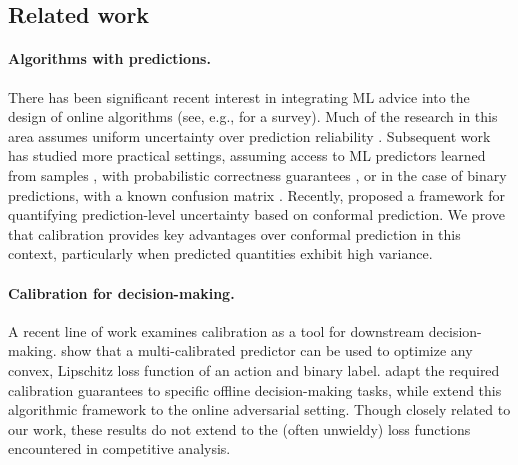 \subsection{Related work}
\paragraph{Algorithms with predictions.} There has been significant recent interest in integrating ML advice into the design of online algorithms (see, e.g., \citet{Mitzenmacher22:Algorithms} for a survey). Much of the research in this area assumes uniform uncertainty over prediction reliability \citep[e.g.,][]{Lykouris18:Competitive, Purohit18:Improving, Wei20:Optimal}. Subsequent work has studied more practical settings, assuming access to ML predictors learned from samples \citep{Anand20:Customizing}, with probabilistic correctness guarantees \citep{Gupta21:Distribution}, or in the case of binary predictions, with a known confusion matrix \citep{Cho22:Scheduling}. Recently, \citet{Sun24:Online} proposed a framework for quantifying prediction-level uncertainty based on conformal prediction. We prove that calibration provides key advantages over conformal prediction in this context, particularly when predicted quantities exhibit high variance.

\paragraph{Calibration for decision-making.}
A recent line of work examines calibration as a tool for downstream decision-making. \citet{Gopalan22:Loss} show that a multi-calibrated predictor can be used to optimize any convex, Lipschitz loss function of an action and binary label. \citet{Zhao21:Calibrating} adapt the required calibration guarantees to specific offline decision-making tasks, while \citet{Noarov23:High} extend this algorithmic framework to the online adversarial setting. Though closely related to our work, these results do not extend to the (often unwieldy) loss functions encountered in competitive analysis.